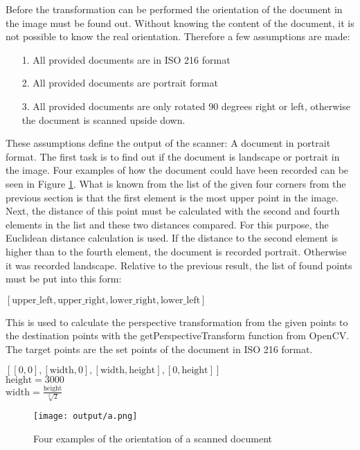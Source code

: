 \documentclass[twocolumn,10pt]{asme2ej}
\newcommand*\redcircled[1]{\tikz[baseline=(char.base)]{
            \node[shape=circle,draw,inner sep=2pt, fill=red!40] (char) {#1};}}
\newcommand*\bluecircled[1]{\tikz[baseline=(char.base)]{
            \node[shape=circle,draw,inner sep=2pt, fill=blue!40] (char) {#1};}}
\begin{document}
Before the transformation can be performed the orientation of the document in the image must be found out.
Without knowing the content of the document, it is not possible to know the real orientation. Therefore a few assumptions are made:
\begin{itemize}
    \item[1.] All provided documents are in ISO 216 format
    \item[2.] All provided documents are portrait format
    \item[3.] All provided documents are only rotated 90 degrees right or left, otherwise the document is scanned upside down.
\end{itemize}
These assumptions define the output of the scanner: A document in portrait format.
The first task is to find out if the document is landscape or portrait in the image.
Four examples of how the document could have been recorded can be seen in Figure \ref{fig:fourcorners}.
What is known from the list of the given four corners from the previous section is that the first element \bluecircled{-} is the most upper point in the image. 
Next, the distance of this point must be calculated with the second and fourth elements \redcircled{-} in the list and these two distances compared. For this purpose, the Euclidean distance calculation is used. If the distance to the second element is higher than to the fourth element, the document is recorded portrait. Otherwise it was recorded landscape. 
Relative to the previous result, the list of found points must be put into this form:
\begin{center}
    $[\textrm{upper\_left}, \textrm{upper\_right}, \textrm{lower\_right}, \textrm{lower\_left}]$
\end{center}
This is used to calculate the perspective transformation from the given points to the destination points with the getPerspectiveTransform\cite{opencv_getPerspectiveTransform} function from OpenCV. 
The target points are the set points of the document in ISO 216 format.
\begin{center}
    $[[0,0], [\textrm{width},0], [\textrm{width},\textrm{height}], [0,\textrm{height}]]$\\
    $\textrm{height}=3000$\\
    $\textrm{width}=\frac{\textrm{height}}{\sqrt[2]{2}}$
\end{center}
\begin{figure}[H]
    \centerline{\texttt{[image: output/a.png]}}
    \caption{Four examples of the orientation of a scanned document}
    \label{fig:fourcorners}
\end{figure}
\end{document}
